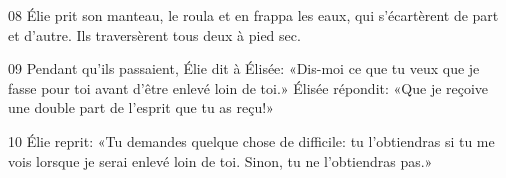 
08 Élie prit son manteau, le roula et en frappa les eaux, qui s’écartèrent de part et d’autre. Ils traversèrent tous deux à pied sec.

09 Pendant qu’ils passaient, Élie dit à Élisée: «Dis-moi ce que tu veux que je fasse pour toi avant d’être enlevé loin de toi.» Élisée répondit: «Que je reçoive une double part de l’esprit que tu as reçu!»

10 Élie reprit: «Tu demandes quelque chose de difficile: tu l’obtiendras si tu me vois lorsque je serai enlevé loin de toi. Sinon, tu ne l’obtiendras pas.»
